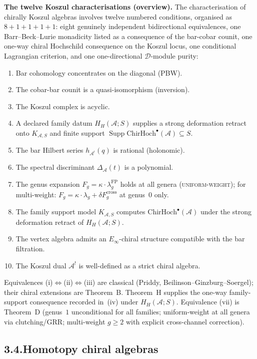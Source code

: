 \documentclass[11pt,reqno]{amsart}
\theoremstyle{definition}
\theoremstyle{remark}
\providecommand{\cA}{\mathcal{A}}
\providecommand{\ChirHoch}{\mathrm{ChirHoch}}
\numberwithin{equation}{section}
\begin{document}
\medskip
\noindent\textbf{The twelve Koszul characterisations (overview).}\enspace
The characterisation of chirally Koszul algebras involves twelve
numbered conditions, organised as $8 + 1 + 1 + 1 + 1$: eight
genuinely independent bidirectional equivalences, one
Barr--Beck--Lurie monadicity listed as a consequence of the
bar-cobar counit, one one-way chiral Hochschild consequence on
the Koszul locus, one conditional Lagrangian criterion, and one
one-directional $\mathcal{D}$-module purity:
\begin{enumerate}[label=(\roman*)]
\item Bar cohomology concentrates on the diagonal (PBW).
\item The cobar-bar counit is a quasi-isomorphism (inversion).
\item The Koszul complex is acyclic.
\item A declared family datum \(H_H(\cA;S)\) supplies a strong
deformation retract onto \(K_{\cA,S}\) and finite support
\(\operatorname{Supp}\ChirHoch^\bullet(\cA)\subseteq S\).
\item The bar Hilbert series $h_{\cA^!}(q)$ is rational (holonomic).
\item The spectral discriminant $\Delta_\cA(t)$ is a polynomial.
\item The genus expansion $F_g=\kappa\cdot\lambda_g^{\mathrm{FP}}$
holds at all genera \textsc{(uniform-weight)};
for multi-weight: $F_g=\kappa\cdot\lambda_g+\delta F_g^{\mathrm{cross}}$
at genus~$0$ only.
\item The family support model \(K_{\cA,S}\) computes
\(\ChirHoch^\bullet(\cA)\) under the strong deformation retract of
\(H_H(\cA;S)\).
\item The vertex algebra admits an $E_\infty$-chiral structure
compatible with the bar filtration.
\item The Koszul dual $\cA^!$ is well-defined as a strict chiral algebra.
\end{enumerate}
Equivalences (i)$\Leftrightarrow$(ii)$\Leftrightarrow$(iii) are
classical (Priddy, Beilinson--Ginzburg--Soergel); their chiral
extensions are Theorem~B.  Theorem~H supplies the one-way
family-support consequence recorded in~\textup{(iv)} under
\(H_H(\cA;S)\).
Equivalence (vii) is Theorem~D (genus~$1$ unconditional for
all families; uniform-weight at all genera via
clutching/GRR; multi-weight $g \ge 2$ with explicit
cross-channel correction).

\subsection*{3.4.\enspace Homotopy chiral algebras}
\end{document}
